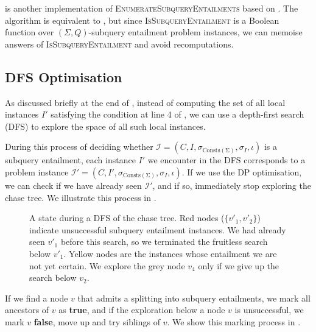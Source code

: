 \documentclass[12pt]{report}
\theoremstyle{plain}
\theoremstyle{definition}
\def\Consts{{\mathrm{Consts}}}
\begin{document}
 is another implementation of \nobreak\textsc{EnumerateSubqueryEntailments} based on . The algorithm is equivalent to , but since \textsc{IsSubqueryEntailment} is a Boolean function over $(\Sigma, Q)$-subquery entailment problem instances, we can memoise answers of \textsc{IsSubqueryEntailment} and avoid recomputations.

\subsection{DFS Optimisation}
\label{subsection:dfs-optimisation}

As discussed briefly at the end of , instead of computing the set of all local instances $I'$ satisfying the condition at line 4 of , we can use a depth-first search (DFS) to explore the space of all such local instances.

During this process of deciding whether $\mathcal{I} = (C, I, \sigma_{\mathrm{\Consts(\Sigma)}}, \sigma_I, \iota)$ is a subquery entailment, each instance $I'$ we encounter in the DFS corresponds to a problem instance $\mathcal{I'} = (C, I', \sigma_{\mathrm{\Consts(\Sigma)}}, \sigma_I, \iota)$. If we use the DP optimisation, we can check if we have already seen $\mathcal{I'}$, and if so, immediately stop exploring the chase tree. We illustrate this process in .

\begin{figure}[t]
\centering

\caption{A state during a DFS of the chase tree. Red nodes ($\{v'_1, v'_2\}$) indicate unsuccessful subquery entailment instances. We had already seen $v'_1$ before this search, so we terminated the fruitless search below $v'_1$. Yellow nodes are the instances whose entailment we are not yet certain. We explore the grey node $v_4$ only if we give up the search below $v_2$.}
\label{figure:sctree-dfs-process}
\end{figure}

If we find a node $v$ that admits a splitting into subquery entailments, we mark all ancestors of $v$ as \textbf{true}, and if the exploration below a node $v$ is unsuccessful, we mark $v$ \textbf{false}, move up and try siblings of $v$. We show this marking process in .
\end{document}

